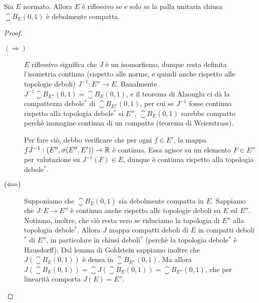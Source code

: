 \begin{theorem}[Kakutani]
\label{th:kakutani}
	Sia $E$ normato.
	Allora $E$ è riflessivo se e solo se la palla unitaria chiusa $\closure B_E(0,1)$ è debolmente compatta.
\end{theorem}
\begin{proof}
	\leavevmode
	\begin{description}
		\item[$(\Longrightarrow)$] $E$ riflessivo significa che $J$ è un isomorfismo, dunque resta definita l'isometria continua (rispetto alle norme, e quindi anche rispetto alle topologie deboli) $J^{-1} : E'' \to E$.
		Banalmente $J^{-1}\closure B_{E''}(0,1) = \closure B_E(0,1)$, e il teorema di Alaouglu ci dà la compattezza debole$^*$ di $\closure B_{E''}(0,1)$, per cui se $J^{-1}$ fosse continua rispetto alla topologia debole$^*$ si $E''$, $\closure B_E(0,1)$ sarebbe compatto perchè immagine continua di un compatto (teorema di Weierstrass).

		Per fare ciò, debbo verificare che per ogni $f \in E'$, la mappa $f J^{-1} : (E'', \sigma(E'', E')) \to \mathbb{R}$ è continua. Essa agisce su un elemento $F \in E''$ per valutazione su $J^{-1}(F) \in E$, dunque è continua rispetto alla topologia debole$^*$.

		\item[$(\Longleftarrow)$] Supponiamo che $\closure B_E(0,1)$ sia debolmente compatta in $E$.
		Sappiamo che $J:E \to E''$ è continua anche rispetto alle topologie deboli su $E$ ed $E''$. Notiamo, inoltre, che ciò resta vero se riduciamo la topologia di $E''$ alla topologia debole$^*$.
		Allora $J$ mappa compatti deboli di $E$ in compatti deboli$^*$ di $E''$, in particolare in chiusi deboli$^*$ (perchè la topologia debole$^*$ è Hausdorff).
		Dal lemma di Goldstein sappiamo inoltre che $J(\closure B_E(0,1))$ è densa in $\closure B_{E''}(0,1)$.
		Ma allora $J(\closure B_E(0,1)) = \closure{J(\closure B_E(0,1))} = \closure B_{E''}(0,1)$, che per linearità comporta $J(E) = E''$.
	\end{description}
\end{proof}

